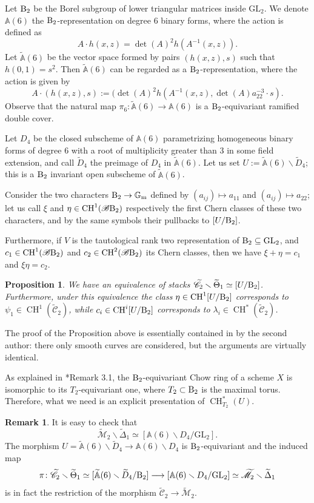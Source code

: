 \documentclass[a4paper, 10pt]{amsart}
\numberwithin{equation}{section}
\numberwithin{subsection}{section}
\newtheorem{proposition}[theorem]{Proposition}
\theoremstyle{definition}
\newtheorem{remark}[theorem]{Remark}
\theoremstyle{remark}
\renewcommand{\mathcal}{\mathscr}
\renewcommand\AA{\mathbb{A}} \newcommand\BB{\mathbb{B}}
\newcommand\GG{\mathbb{G}} \newcommand\HH{\mathbb{H}}
\newcommand\rmm{\mathrm{m}} \newcommand\rmn{\mathrm{n}}
\newcommand\arr{\ifinner\to\else\longrightarrow\fi}
\renewcommand{\setminus}{\smallsetminus}
\newcommand{\gm}{\GG_{\rmm}}
\newcommand{\GL}{\mathrm{GL}}
\newcommand{\Mtilde}{\widetilde{\mathcal M}}
\newcommand{\Ctilde}{\widetilde{\mathcal C}}
\newcommand{\Dtilde}{\widetilde{\Delta}}
\newcommand{\ThTilde}{\widetilde{\Theta}}
\newcommand{\ch}[1][*]{\operatorname{CH}^{#1}}
\begin{document}
	Let ${\rm B}_2$ be the Borel subgroup of lower triangular matrices inside $\GL_2$. We denote $\AA(6)$ the $\rm B_2$-representation on degree 6 binary forms, where the action is defined as
	\[A\cdot h(x,z)=\det(A)^2 h(A^{-1}(x,z)). \]
	Let $\widetilde{\AA}(6)$ be the vector space formed by pairs $(h(x,z),s)$ such that $h(0,1)=s^2$. Then $\widetilde{\mathbb{A}}(6)$ can be regarded as a $\rm B_2$-representation, where the action is given by
	\[A\cdot (h(x,z),s):=(\det(A)^2 h(A^{-1}(x,z), \det(A)a_{22}^{-3}\cdot s). \]
	Observe that the natural map $\pi_6\colon\widetilde{\AA}(6)\to\AA(6)$ is a $\rm B_2$-equivariant ramified double cover.
	
	
	Let $D_4$ be the closed subscheme of $\AA(6)$ parametrizing homogeneous binary forms of degree $6$ with a root of multiplicity greater than $3$ in some field extension, and call $\widetilde{D}_4$ the preimage of $D_4$ in $\widetilde{\AA}(6)$. Let us set $U:=\widetilde{\AA}(6) \setminus \widetilde{D}_4$; this is a $\mathrm{B}_{2}$ invariant open subscheme of $\widetilde{\AA}(6)$.
	
	Consider the two characters $\rB_{2} \arr \gm$ defined by $(a_{ij}) \mapsto a_{11}$ and $(a_{ij}) \mapsto a_{22}$; let us call $\xi$ and $\eta \in \ch[1](\cB\rB_{2})$ respectively the first Chern classes of these two characters, and by the same symbols their pullbacks to $[U/\mathrm{B}_{2}]$.
	
	Furthermore, if $V$ is the tautological rank two representation of $\rB_{2} \subseteq \GL_{2}$, and $c_{1} \in \ch[1](\cB\rB_{2})$ and $c_{2} \in \ch[2](\cB\rB_{2})$ its Chern classes, then we have $\xi+\eta = c_{1}$ and $\xi\eta = c_{2}$.
	
	\begin{proposition}\label{prop:open-strata}
		We have an equivalence of stacks $\Ctilde_2\smallsetminus\ThTilde_1 \simeq [U/{\rm B}_2]$. Furthermore, under this equivalence the class $\eta \in \ch[1][U/{\rm B}_2]$ corresponds to $\psi_{1} \in \ch[1](\Ctilde_{2})$, while $c_{i} \in \ch[i][U/{\rm B}_2]$ corresponds to $\lambda_{i} \in \ch(\Ctilde_{2})$.
	\end{proposition}
	
	The proof of the Proposition above is essentially contained in \cite{Per} by the second author: there only smooth curves are considered, but the arguments are virtually identical.
	
	As explained in \cite{Per}*{Remark 3.1}, the ${\rm B}_2$-equivariant Chow ring of a scheme $X$ is isomorphic to its $T_2$-equivariant one, where $T_2 \subset {\rm B}_2$ is the maximal torus. Therefore, what we need is an explicit presentation of $\ch_{T_2}(U)$.
	\begin{remark}
		It is easy to check that
		$$ \Mtilde_2\setminus \Dtilde_1 \simeq [\AA(6)\setminus D_4/\GL_2]. $$
		The morphism $U = \widetilde{\AA}(6) \setminus \widetilde{D}_4 \rightarrow \AA(6)\setminus D_4$ is $\mathrm{B}_{2}$-equivariant and the induced map 
		$$ \pi\colon\Ctilde_2 \setminus \ThTilde_1 \simeq [\widetilde{\AA}(6) \setminus \widetilde{D}_4/{\rm B}_2] \longrightarrow [\AA(6) \setminus D_4/\GL_2] \simeq \Mtilde_2\setminus \Dtilde_1$$ 
		is in fact the restriction of the morphism $\Ctilde_2 \rightarrow \Mtilde_2$.
	\end{remark}
	
\end{document}
